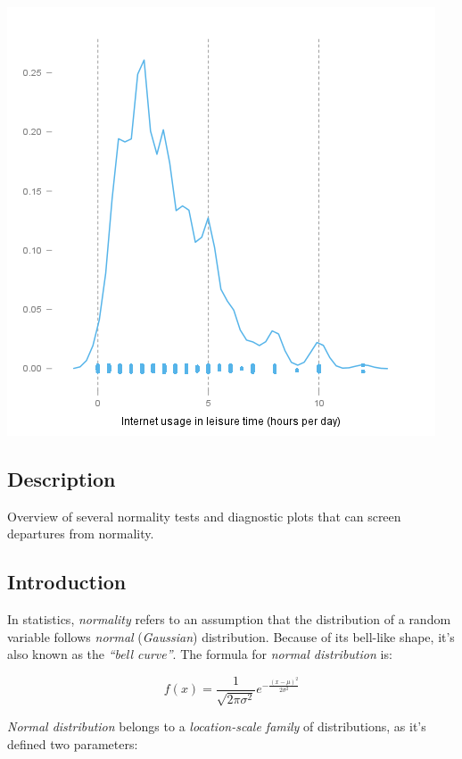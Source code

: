 \documentclass[]{article}
\makeatletter
\def\maxwidth{\ifdim\Gin@nat@width>\linewidth\linewidth
\else\Gin@nat@width\fi}
\let\Oldincludegraphics\includegraphics
\renewcommand{\includegraphics}[1]{\Oldincludegraphics[width=\maxwidth]{#1}}
\makeatother
\begin{document}
\href{f97c1f6e5897d555baf02b977276ccfe-hires.png}{\includegraphics{f97c1f6e5897d555baf02b977276ccfe.png}}

\subsection{Description}

Overview of several normality tests and diagnostic plots that can screen
departures from normality.

\subsection{Introduction}

In statistics, \emph{normality} refers to an assumption that the
distribution of a random variable follows \emph{normal}
(\emph{Gaussian}) distribution. Because of its bell-like shape, it's
also known as the \emph{``bell curve''}. The formula for \emph{normal
distribution} is:

\[f(x) = \frac{1}{\sqrt{2\pi{}\sigma{}^2}} e^{-\frac{(x-\mu{})^2}{2\sigma{}^2}}\]

\emph{Normal distribution} belongs to a \emph{location-scale family} of
distributions, as it's defined two parameters:
\end{document}
